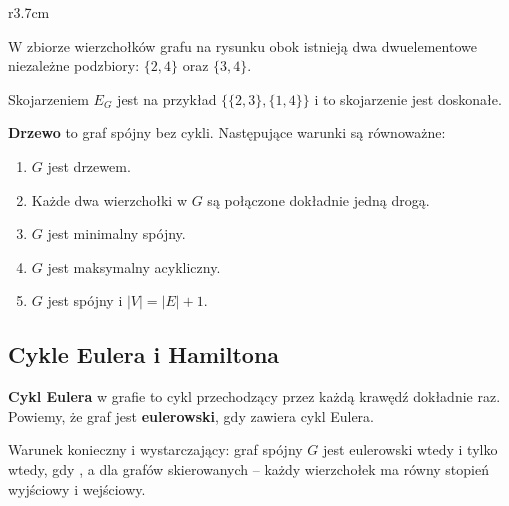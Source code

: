 \begin{example}
    \begin{wrapfigure}{r}{3.7cm}
        \vspace{-6mm}
    \end{wrapfigure}
    W zbiorze wierzchołków grafu na rysunku obok istnieją dwa dwuelementowe niezależne podzbiory: $\{2, 4\}$ oraz $\{3, 4\}$.
    \bigskip

    Skojarzeniem $E_G$ jest na przykład $\big\{\{2, 3\}, \{1, 4\}\big\}$ i to skojarzenie jest doskonałe.
\end{example}

\textbf{Drzewo} to graf spójny bez cykli. Następujące warunki są równoważne:
\begin{enumerate}
    \item $G$ jest drzewem.
    \item Każde dwa wierzchołki w $G$ są połączone dokładnie jedną drogą.
    \item $G$ jest minimalny spójny.
    \item $G$ jest maksymalny acykliczny.
    \item $G$ jest spójny i $|V| = |E| + 1$.
\end{enumerate}

\subsection{Cykle Eulera i Hamiltona}
\textbf{Cykl Eulera} w grafie to cykl przechodzący przez każdą krawędź dokładnie raz. Powiemy, że graf jest \textbf{eulerowski}, gdy zawiera cykl Eulera.

Warunek konieczny i wystarczający: graf spójny $G$ jest eulerowski wtedy i tylko wtedy, gdy , a dla grafów skierowanych -- każdy wierzchołek ma równy stopień wyjściowy i wejściowy.
\bigskip

